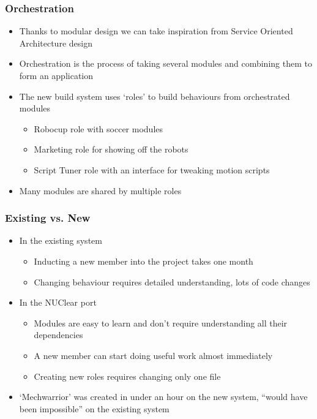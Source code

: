 \documentclass{beamer}
\begin{document}
\begin{frame}
	\frametitle{Orchestration}
	\begin{itemize}
		\item Thanks to modular design we can take inspiration from Service Oriented Architecture design
		\item Orchestration is the process of taking several modules and combining them to form an application
		\item The new build system uses `roles' to build behaviours from orchestrated modules
		\begin{itemize}
			\item Robocup role with soccer modules
			\item Marketing role for showing off the robots
			\item Script Tuner role with an interface for tweaking motion scripts
		\end{itemize}
		\item Many modules are shared by multiple roles
	\end{itemize}
\end{frame}

\begin{frame}
	\frametitle{Existing vs. New}
	
	\begin{itemize}
		\item In the existing system
		\begin{itemize}
			\item Inducting a new member into the project takes one month
			\item Changing behaviour requires detailed understanding, lots of code changes
		\end{itemize}
		\item In the NUClear port
		\begin{itemize}
			\item Modules are easy to learn and don't require understanding all their dependencies
			\item A new member can start doing useful work almost immediately
			\item Creating new roles requires changing only one file
		\end{itemize}
		\item `Mechwarrior' was created in under an hour on the new system, ``would have been impossible'' on the existing system
	\end{itemize}
\end{frame}
\end{document}
